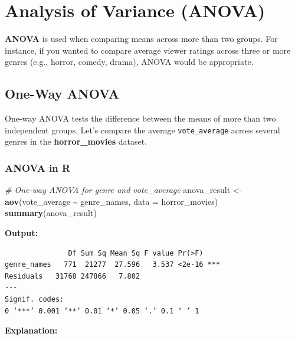 \documentclass[
]{book}
\newenvironment{Shaded}{\begin{snugshade}}{\end{snugshade}}
\newcommand{\AttributeTok}[1]{\textcolor[rgb]{0.13,0.29,0.53}{#1}}
\newcommand{\CommentTok}[1]{\textcolor[rgb]{0.56,0.35,0.01}{\textit{#1}}}
\newcommand{\FunctionTok}[1]{\textcolor[rgb]{0.13,0.29,0.53}{\textbf{#1}}}
\newcommand{\NormalTok}[1]{#1}
\newcommand{\OtherTok}[1]{\textcolor[rgb]{0.56,0.35,0.01}{#1}}
\newcommand{\SpecialCharTok}[1]{\textcolor[rgb]{0.81,0.36,0.00}{\textbf{#1}}}
\begin{document}
\section{Analysis of Variance (ANOVA)}\label{analysis-of-variance-anova}

\textbf{ANOVA} is used when comparing means across more than two groups. For instance, if you wanted to compare average viewer ratings across three or more genres (e.g., horror, comedy, drama), ANOVA would be appropriate.

\subsection*{One-Way ANOVA}\label{one-way-anova}

One-way ANOVA tests the difference between the means of more than two independent groups. Let's compare the average \texttt{vote\_average} across several genres in the \textbf{horror\_movies} dataset.

\subsubsection*{ANOVA in R}\label{anova-in-r}

\begin{Shaded}
\begin{Highlighting}[]
\CommentTok{\# One{-}way ANOVA for genre and vote\_average}
\NormalTok{anova\_result }\OtherTok{\textless{}{-}} \FunctionTok{aov}\NormalTok{(vote\_average }\SpecialCharTok{\textasciitilde{}}\NormalTok{ genre\_names, }\AttributeTok{data =}\NormalTok{ horror\_movies)}
\FunctionTok{summary}\NormalTok{(anova\_result)}
\end{Highlighting}
\end{Shaded}

\textbf{Output:}

\begin{verbatim}
               Df Sum Sq Mean Sq F value Pr(>F)    
genre_names   771  21277  27.596   3.537 <2e-16 ***
Residuals   31768 247866   7.802                   
---
Signif. codes:  
0 ‘***’ 0.001 ‘**’ 0.01 ‘*’ 0.05 ‘.’ 0.1 ‘ ’ 1
\end{verbatim}

\textbf{Explanation:}
\end{document}
